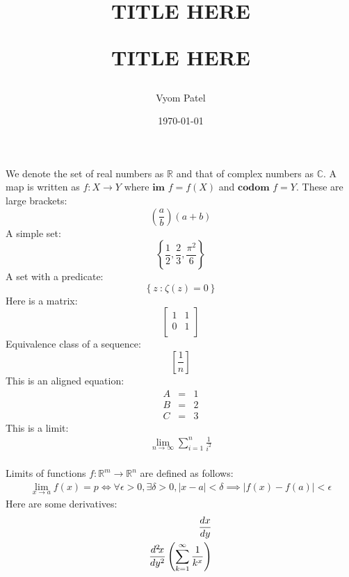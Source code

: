 \documentclass[fleqn]{article}
\title{\textbf{TITLE HERE}
	
	TITLE HERE
}
\author{Vyom Patel}
\date{\today}
\newcommand{\R}{\mathbb{R}}
\newcommand{\C}{\mathbb{C}}
\newcommand{\fn}[3]{#1 : #2 \rightarrow #3}
\newcommand{\br}[1]{\left( #1 \right)}
\newcommand{\curly}[1]{\left\{ #1 \right\}}
\newcommand{\set}[2]{\curly{#1\ \textbf{:}\ #2}}
\newcommand{\im}{\textbf{im }}
\newcommand{\codom}{\textbf{codom }}
\newcommand{\sbr}[1]{\left[ #1 \right]}
\newcommand{\eqn}[1]{\begin{eqnarray*} #1 \end{eqnarray*}}
\newcommand{\abs}[1]{\left| #1 \right|}
\newcommand{\eps}{\epsilon}
\newcommand{\del}{\delta}
\newcommand{\limit}[3]{\lim_{#1 \rightarrow #2}#3}
\newcommand{\bmat}[1]{\ensuremath{\begin{bmatrix} #1 \end{bmatrix}}}
\newcommand{\diff}[3][]{%
	\ifthenelse{\equal{#1}{}}{%
		\ensuremath{\frac{d{#2}}{d{#3}}}%
	}{%
		\ensuremath{\frac{d^{#1}\!{#2}}{d{#3}^{#1}}}%
	}%
}
\begin{document}
	\maketitle
	
	We denote the set of real numbers as $\R$ and that of complex numbers as
	$\C$.
	A map is written as $\fn{f}{X}{Y}$ where $\im f = f(X)$ and $\codom f = Y$.
	These are large brackets:
	\[
	\br{\frac{a}{b}}\br{a + b}
	\]
	A simple set:
	\[
	\curly{\frac{1}{2}, \frac{2}{3}, \frac{\pi^2}{6}}
	\]
	A set with a predicate:
	\[
	\set{z}{\zeta\br{z} = 0}
	\]
	Here is a matrix:
	\[
	\bmat{
		1 & 1 \\
		0 & 1 \\
	}
	\]
	Equivalence class of a sequence:
	\[
	\sbr{\frac{1}{n}}
	\]
	This is an aligned equation:
	\eqn{
		A &=& 1\\
		B &=& 2\\
		C &=& 3
	}
	This is a limit:
	\eqn{
		\limit{n}{\infty}{\sum_{i = 1}^n \frac{1}{i^2}}
	}
\\

	Limits of functions $\fn{f}{\R^m}{\R^n}$ are defined as follows:
	\eqn{
		\limit{x}{a}{f(x)} = p \iff
		\forall \eps > 0, \exists \del > 0, \abs{x - a} < \del
		\implies \abs{f(x) - f(a)} < \eps
	}
	Here are some derivatives:
	\eqn{
		\diff{x}{y}\\
		\diff[2]{x}{y} \br{\sum_{k = 1}^{\infty}\frac{1}{k^x}}
	}
	
\end{document}

